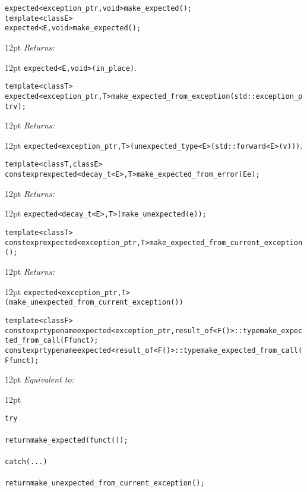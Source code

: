 \documentclass[a4paper,10pt]{article}
\newcommand{\cpp}[1]{\lstinline{#1}}
\newcommand{\wordingItem}[1]{\noindent\textit{#1:}}
\newenvironment{wordingTextItem}[1]{\wordingItem{#1}\vspace{2pt}\noindent\begin{adjustwidth}{12pt}{}}{\vspace{2pt}\end{adjustwidth}}
\newenvironment{wordingPara}{\begin{adjustwidth}{12pt}{}}{\end{adjustwidth}}
\newcommand{\suppress}[1]{\colorbox{suppress_color}{#1}}
\newcommand{\update}[1]{\colorbox{update_color}{#1}}
\begin{document}
\begin{alltt}
expected<exception_ptr, void> make_expected(); 
template <class E>
expected<E, void> make_expected(); 
\end{alltt}
\begin{wordingPara}
\begin{wordingTextItem}{Returns}
\cpp{expected<E,void>(in_place)}.
\end{wordingTextItem}
\end{wordingPara}

\begin{alltt}
template <class T>
expected<exception_ptr,T> make_expected_from_exception(std::exception_ptr v); 
\end{alltt}
\begin{wordingPara}
\begin{wordingTextItem}{Returns}
\cpp{expected<exception_ptr,T>(unexpected_type<E>(std::forward<E>(v)))}.
\end{wordingTextItem}
\end{wordingPara}

\begin{alltt}
template <class T, class E>
constexpr expected<decay_t<E>,T> make_expected_from_error(E e);
\end{alltt}
\begin{wordingPara}
\begin{wordingTextItem}{Returns}
\cpp{expected<decay_t<E>,T>(make_unexpected(e));}
\end{wordingTextItem}
\end{wordingPara}


\begin{alltt}
template <class T>
constexpr expected<exception_ptr,T> make_expected_from_current_exception(); 
\end{alltt}
\begin{wordingPara}
\begin{wordingTextItem}{Returns}
\cpp{expected<exception_ptr,T>(make_unexpected_from_current_exception())}
\end{wordingTextItem}
\end{wordingPara}

\begin{alltt}
template <class F>
\suppress{constexpr typename expected<exception_ptr, result_of<F()>::type make_expected_from_call(F funct);}
\update{constexpr typename expected<result_of<F()>::type make_expected_from_call(F funct);}
\end{alltt}
\begin{wordingPara}
\begin{wordingTextItem}{Equivalent to}
\begin{alltt}
  try
  {
    return make_expected(funct());
  }
  catch (...)
  {
    return make_unexpected_from_current_exception();
  }
\end{alltt}
\end{wordingTextItem}
\end{wordingPara}
\end{document}
